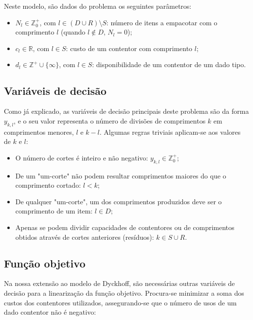 \documentclass[12pt, a4paper, titlepage]{article}
\begin{document}
Neste modelo, são dados do problema os seguintes parâmetros:

\begin{itemize}
    \item $N_l \in \mathbb{Z}^+_0$, com $l \in (D \cup R) \setminus S$: número de itens a empacotar
        com o comprimento $l$ (quando $l \not \in D$, $N_l = 0$);
    \item $c_l \in \mathbb{R}$, com $l \in S$: custo de um contentor com comprimento $l$;
    \item $d_l \in \mathbb{Z}^+ \cup \{ \infty \}$, com $l \in S$: disponibilidade de um contentor
        de um dado tipo.
\end{itemize}

\subsection{Variáveis de decisão}

Como já explicado, as variáveis de decisão principais deste problema são da forma $y_{k, l}$, e o
seu valor representa o número de divisões de comprimentos $k$ em comprimentos menores, $l$ e
$k - l$. Algumas regras triviais aplicam-se aos valores de $k$ e $l$:

\begin{itemize}
    \item O número de cortes é inteiro e não negativo: $y_{k, l} \in \mathbb{Z}^+_0$;
    \item De um "um-corte"{} não podem resultar comprimentos maiores do que o comprimento cortado:
        $l < k$;
    \item De qualquer "um-corte"{}, um dos comprimentos produzidos deve ser o comprimento de um
        item: $l \in D$;
    \item Apenas se podem dividir capacidades de contentores ou de comprimentos obtidos através de
        cortes anteriores (resíduos): $k \in S \cup R$.
\end{itemize}

\subsection{Função objetivo}

Na nossa extensão ao modelo de Dyckhoff, são necessárias outras variáveis de decisão para a
linearização da função objetivo. Procura-se minimizar a soma dos custos dos contentores utilizados,
assegurando-se que o número de usos de um dado contentor não é negativo:
\end{document}
